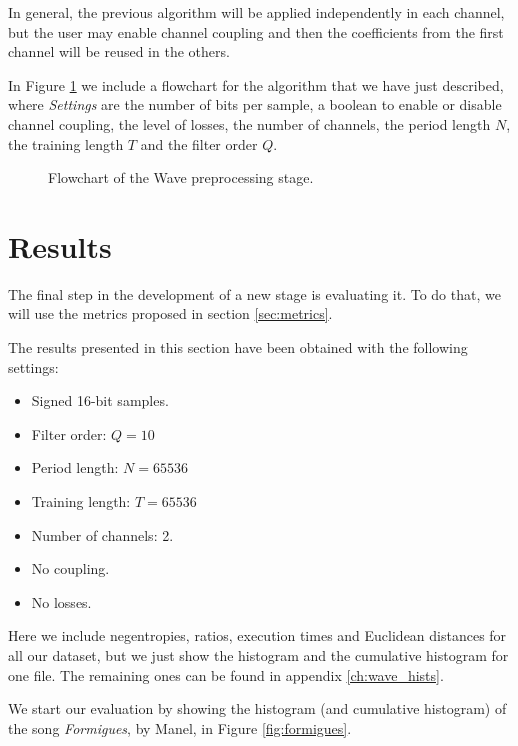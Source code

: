 In general, the previous algorithm will be applied independently in each channel, but the user may enable channel coupling and then the coefficients from the first channel will be reused in the others.

In Figure \ref{fig:wave_flowchart} we include a flowchart for the algorithm that we have just described, where \textit{Settings} are the number of bits per sample, a boolean to enable or disable channel coupling, the level of losses, the number of channels, the period length $N$, the training length $T$ and the filter order $Q$.

\pagebreak
\begin{figure}[h!]
	\begin{center}
		\scalebox{.93}{}
	\end{center}
	\caption{Flowchart of the Wave preprocessing stage.}
	\label{fig:wave_flowchart}
\end{figure}

\section{Results} \label{sec:wave_results}
The final step in the development of a new stage is evaluating it. To do that, we will use the metrics proposed in section \ref{sec:metrics}.

The results presented in this section have been obtained with the following settings:
\begin{itemize}
	\item Signed 16-bit samples.
	\item Filter order: $Q = 10$
	\item Period length: $N = 65536$
	\item Training length: $T = 65536$
	\item Number of channels: 2.
	\item No coupling.
	\item No losses.
\end{itemize}

Here we include negentropies, ratios, execution times and Euclidean distances for all our dataset, but we just show the histogram and the cumulative histogram for one file. The remaining ones can be found in appendix \ref{ch:wave_hists}.

We start our evaluation by showing the histogram (and cumulative histogram) of the song \textit{Formigues}, by Manel, in Figure \ref{fig:formigues}.

